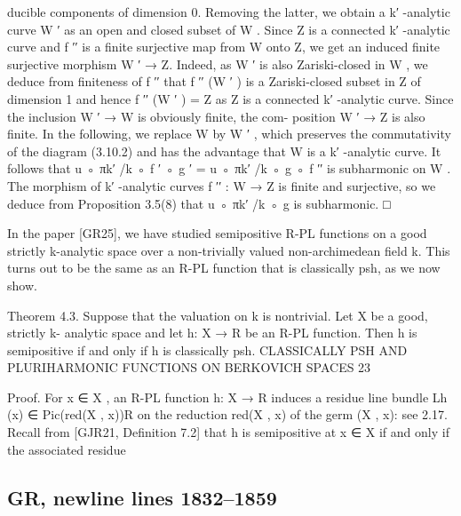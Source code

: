 \documentclass[
  10pt,
]{article}
\newenvironment{Shaded}{}{}
\newcommand{\NormalTok}[1]{#1}
\begin{document}
\begin{Shaded}
\begin{Highlighting}[]
\NormalTok{ducible components of dimension 0. Removing the latter, we obtain a k′ {-}analytic curve}
\NormalTok{W ′ as an open and closed subset of W . Since Z is a connected k′ {-}analytic curve and f ′′}
\NormalTok{is a finite surjective map from W onto Z, we get an induced finite surjective morphism}
\NormalTok{W ′ → Z. Indeed, as W ′ is also Zariski{-}closed in W , we deduce from finiteness of f ′′ that}
\NormalTok{f ′′ (W ′ ) is a Zariski{-}closed subset in Z of dimension 1 and hence f ′′ (W ′ ) = Z as Z is a}
\NormalTok{connected k′ {-}analytic curve. Since the inclusion W ′ → W is obviously finite, the com{-}}
\NormalTok{position W ′ → Z is also finite. In the following, we replace W by W ′ , which preserves}
\NormalTok{the commutativity of the diagram (3.10.2) and has the advantage that W is a k′ {-}analytic}
\NormalTok{curve. It follows that u ◦ πk′ /k ◦ f ′ ◦ g ′ = u ◦ πk′ /k ◦ g ◦ f ′′ is subharmonic on W . The}
\NormalTok{morphism of k′ {-}analytic curves f ′′ : W → Z is finite and surjective, so we deduce from}
\NormalTok{Proposition 3.5(8) that u ◦ πk′ /k ◦ g is subharmonic.                                           □}

\NormalTok{  In the paper [GR25], we have studied semipositive R{-}PL functions on a good strictly}
\NormalTok{k{-}analytic space over a non{-}trivially valued non{-}archimedean field k. This turns out to}
\NormalTok{be the same as an R{-}PL function that is classically psh, as we now show.}

\NormalTok{Theorem 4.3. Suppose that the valuation on k is nontrivial. Let X be a good, strictly k{-}}
\NormalTok{analytic space and let h: X → R be an R{-}PL function. Then h is semipositive if and only if h}
\NormalTok{is classically psh.}
\NormalTok{              CLASSICALLY PSH AND PLURIHARMONIC FUNCTIONS ON BERKOVICH SPACES                  23}

\NormalTok{Proof. For x ∈ X , an R{-}PL function h: X → R induces a residue line bundle Lh (x) ∈}
\NormalTok{Pic(red(X , x))R on the reduction red(X , x) of the germ (X , x): see 2.17. Recall from}
\NormalTok{[GJR21, Definition 7.2] that h is semipositive at x ∈ X if and only if the associated residue}
\end{Highlighting}
\end{Shaded}

\subsection{GR, newline lines
1832--1859}\label{gr-newline-lines-18321859}
\end{document}
